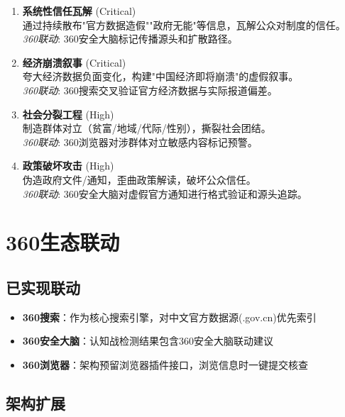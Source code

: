 \documentclass[12pt,a4paper]{ctexart}
\begin{document}
\begin{enumerate}[leftmargin=*]

\item \textbf{系统性信任瓦解} (Critical)\\
通过持续散布"官方数据造假""政府无能"等信息，瓦解公众对制度的信任。\\
\textit{360联动}: 360安全大脑标记传播源头和扩散路径。

\item \textbf{经济崩溃叙事} (Critical)\\
夸大经济数据负面变化，构建"中国经济即将崩溃"的虚假叙事。\\
\textit{360联动}: 360搜索交叉验证官方经济数据与实际报道偏差。

\item \textbf{社会分裂工程} (High)\\
制造群体对立（贫富/地域/代际/性别），撕裂社会团结。\\
\textit{360联动}: 360浏览器对涉群体对立敏感内容标记预警。

\item \textbf{政策破坏攻击} (High)\\
伪造政府文件/通知，歪曲政策解读，破坏公众信任。\\
\textit{360联动}: 360安全大脑对虚假官方通知进行格式验证和源头追踪。

\end{enumerate}

\section{360生态联动}

\subsection{已实现联动}

\begin{itemize}[leftmargin=*]
    \item \textbf{360搜索}：作为核心搜索引擎，对中文官方数据源(.gov.cn)优先索引
    \item \textbf{360安全大脑}：认知战检测结果包含360安全大脑联动建议
    \item \textbf{360浏览器}：架构预留浏览器插件接口，浏览信息时一键提交核查
\end{itemize}

\subsection{架构扩展}
\end{document}
